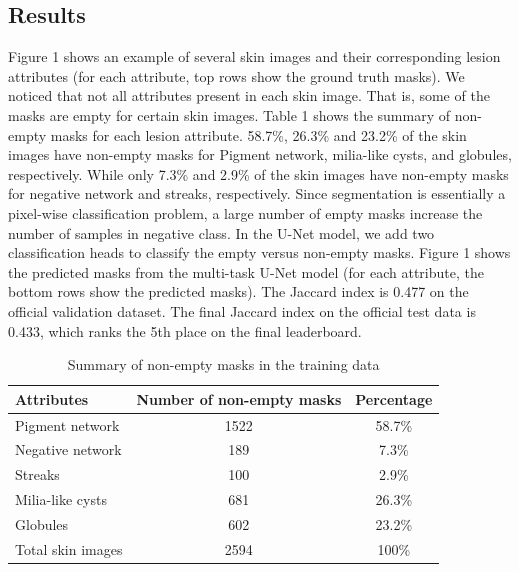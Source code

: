 \documentclass{article}
\begin{document}
\subsection{Results}
Figure 1 shows an example of several skin images and their corresponding lesion attributes (for each attribute, top rows show the ground truth masks).  We noticed that not all attributes present in each skin image. That is, some of the masks are empty for certain skin images. Table 1 shows the summary of non-empty masks for each lesion attribute. 58.7\%, 26.3\% and 23.2\% of the skin images have non-empty masks for Pigment network, milia-like cysts, and globules, respectively.  While only 7.3\% and 2.9\% of the skin images have non-empty masks for negative network and streaks, respectively. Since segmentation is essentially a pixel-wise classification problem, a large number of empty masks increase the number of samples in negative class.  In the U-Net model, we add two classification heads to classify the empty versus non-empty masks. Figure 1 shows the predicted masks from the multi-task U-Net model (for each attribute, the bottom rows show the predicted masks). The Jaccard index is 0.477 on the official validation dataset. The final Jaccard index on the official test data is 0.433, which ranks the 5th place on the final leaderboard.









\begin{table}
  \caption{Summary of non-empty masks in the training data}
  \label{summary-training}
  \centering
  \begin{tabular}{lcc}
    \toprule
    Attributes     &   Number of non-empty masks   & Percentage   \\
    \midrule
    Pigment network & 1522  & 58.7\%    \\
    Negative network     & 189 & 7.3\%      \\
    Streaks     & 100       & 2.9\%  \\
    Milia-like cysts & 681  & 26.3\%     \\
    Globules     & 602 & 23.2\%      \\
    \midrule
    Total skin images & 2594 & 100\% \\
    \bottomrule
  \end{tabular}
\end{table}
\end{document}
